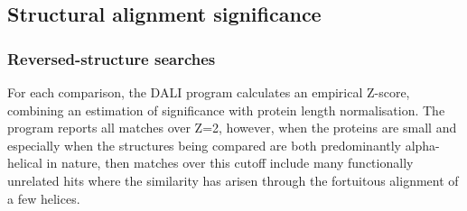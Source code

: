 \documentclass[12pt]{article}
\newcommand{\3}{$3_{10}$}
\begin{document}
% 
% 

\subsection{Structural alignment significance}

\subsubsection{Reversed-structure searches}

For each comparison, the DALI program calculates an empirical Z-score, combining an estimation of
significance with protein length normalisation.   The program reports all matches over Z=2, however,
when the proteins are small and especially when the structures being compared are both predominantly
alpha-helical in nature, then matches over this cutoff include many functionally unrelated
hits where the similarity has arisen through the fortuitous alignment of a few helices.
\end{document}
